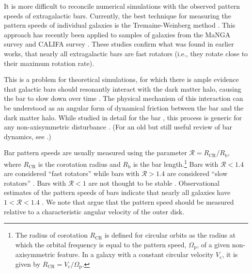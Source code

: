\documentclass[twocolumn,linenumbers,trackchanges]{aastex631}
\newcommand{\RCR}{\ensuremath{R_{\textrm{CR}}}}
\newcommand{\Rot}{\ensuremath{\mathcal{R}}}
\newcommand{\Vc}{\ensuremath{V_{\textrm{c}} }}
\newcommand{\PS}{\ensuremath{\Omega_{\textrm{p}}}}
\newcommand{\Rb}{\ensuremath{R_{\textrm{b}}}}
\begin{document}
It is more difficult to reconcile numerical simulations with the observed
pattern speeds of extragalactic bars. Currently, the best technique for
measuring the pattern speeds of individual galaxies is the Tremaine-Weinberg
method \citep{1984ApJ...282L...5T, 2011MSAIS..18...23C}. This approach has
recently been applied to samples of galaxies from the MaNGA survey
\citep{2019MNRAS.482.1733G, 2020MNRAS.491.3655G} and CALIFA survey
\citep{2015AA...576A.102A}. These studies confirm what was found in earlier
works, that nearly all extragalactic bars are fast rotators (i.e., they rotate
close to their maximum rotation rate).

This is a problem for theoretical simulations, for which there is ample evidence
that galactic bars should resonantly interact with the dark matter halo, causing
the bar to slow down over time \citep{1981AA....96..164C, 1992ApJ...400...80H,
2000ApJ...543..704D, 2002MNRAS.330...35A, 2002ApJ...569L..83A,
2003MNRAS.341.1179A, 2003MNRAS.346..251O, 2005MNRAS.363..991H,
2006ApJ...637..214M, 2007MNRAS.375..460W, 2009ApJ...697..293D}. The physical
mechanism of this interaction can be understood as an angular form of dynamical
friction between the bar and the dark matter halo. While studied in detail for
the bar \citep{1984MNRAS.209..729T, 1985MNRAS.213..451W}, this process is
generic for any non-axisymmetric disturbance \citep{1972MNRAS.157....1L}. (For
an old but still useful review of bar dynamics, see
\citet{1993RPPh...56..173S}.)

Bar pattern speeds are usually measured using the parameter $\Rot=\RCR/\Rb$,
where \RCR{} is the corotation radius and \Rb{} is the bar length.\footnote{The
radius of corotation \RCR{} is defined for circular orbits as the radius at
which the orbital frequency is equal to the pattern speed, \PS{}, of a given
non-axisymmetric feature. In a galaxy with a constant circular velocity \Vc{},
it is given by $\RCR = \Vc / \PS$.} Bars with $\Rot < 1.4$ are considered
``fast rotators'' while bars with $\Rot > 1.4$ are considered ``slow
rotators'' \citep{2000ApJ...543..704D}. Bars with $\Rot < 1$ are not
thought to be stable \citep{1980AA....81..198C}. Observational estimates of the
pattern speeds of bars indicate that nearly all galaxies have $1 < \Rot < 1.4$
\citep{2011MSAIS..18...23C, 2015AA...576A.102A, 2019MNRAS.482.1733G,
2020MNRAS.491.3655G}. We note that \citet{2017ApJ...835..279F} argue that the
pattern speed should be measured relative to a characteristic angular velocity
of the outer disk.
\end{document}
